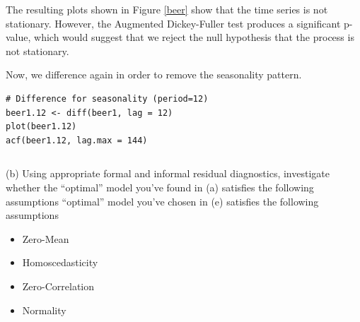 \documentclass[]{article}
\begin{document}
The resulting plots shown in Figure \ref{beer} show that the time series is not stationary. However, the Augmented Dickey-Fuller test produces a significant p-value, which would suggest that we reject the null hypothesis that the process is not stationary.


Now, we difference again in order to remove the seasonality pattern.
\begin{Verbatim}[frame=single]
# Difference for seasonality (period=12)
beer1.12 <- diff(beer1, lag = 12)
plot(beer1.12)
acf(beer1.12, lag.max = 144)
\end{Verbatim}



\begin{Verbatim}[frame=single]

\end{Verbatim}


\color{black}

(b) Using appropriate formal and informal residual diagnostics, investigate whether the “optimal” model you’ve found in (a) satisfies the following assumptions
“optimal” model you’ve chosen in (e) satisfies the following assumptions
\begin{itemize}
  \item Zero-Mean
  \item Homoscedasticity
  \item Zero-Correlation
  \item Normality
\end{itemize}

\color{blue}

\color{black}
\end{document}
